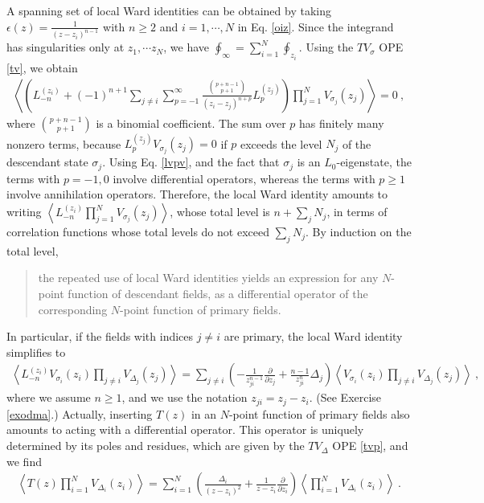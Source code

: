 \documentclass[12pt, a4paper, notitlepage, twoside]{report}
\numberwithin{equation}{section}
\theoremstyle{break}
\begin{document}
A spanning set of local Ward identities can be obtained by taking $\epsilon(z) = \frac{1}{(z-z_i)^{n-1}}$ with $n\geq 2$ and $i=1, \cdots , N$ in Eq. \eqref{oiz}. 
Since the integrand has singularities only at $z_1,\cdots z_N$, we have $\oint_\infty=\sum_{i=1}^N \oint_{z_i}$.
Using the 
$TV_\sigma$ OPE \eqref{tv}, we obtain
\begin{align}
 \left\langle \left( L_{-n}^{(z_i)} + (-1)^{n+1}\sum_{j\neq i}\sum_{p=-1}^\infty \frac{\binom{p+n-1}{p+1}}{(z_i-z_j)^{n+p}} L_p^{(z_j)}\right)  \prod_{j=1}^N V_{\sigma_j}(z_j) \right\rangle = 0\ ,
\label{lwi}
\end{align}
where $\binom{p+n-1}{p+1}$ is a binomial coefficient.
The sum over $p$ has finitely many nonzero terms, because $L_p^{(z_j)}V_{\sigma_j}(z_j)=0$ if $p$ exceeds the level $N_j$ of the descendant state $\sigma_j$. 
Using Eq. \eqref{lvpv}, and the fact that $\sigma_j$ is an $L_0$-eigenstate, the terms with $p=-1,0$ involve differential operators, whereas the terms with $p\geq 1$ involve annihilation operators. 
Therefore, the local Ward identity amounts to writing $\left\langle  L_{-n}^{(z_i)} \prod_{j=1}^N V_{\sigma_j}(z_j) \right\rangle$, whose total level is $n+\sum_j N_j$, in terms of correlation functions whose total levels do not exceed $\sum_jN_j$. By induction on the total level,
\begin{quote}
 the repeated use of local Ward identities yields an expression for any $N$-point function of descendant fields, as a differential operator of the corresponding $N$-point function of primary fields.
\end{quote}
In particular, if the fields with indices $j\neq i$ are primary, the local Ward identity simplifies to
\begin{align}
 \boxed{\left\langle L_{-n}^{(z_i)}V_{\sigma_i}(z_i)\prod_{j\neq i} V_{\Delta_j}(z_j) \right\rangle =
\sum_{j\neq i} \left(-\frac{1}{z_{ji}^{n-1}} {\frac{\partial}{\partial z_j}}  + \frac{n-1}{z_{ji}^n} \Delta_j\right)
\left\langle V_{\sigma_i}(z_i)\prod_{j\neq i} V_{\Delta_j}(z_j) \right\rangle} \ ,
\label{lmn}
\end{align}
where we assume $n\geq 1$, and we use the notation $z_{ji}=z_j-z_i$. (See Exercise \ref{exodma}.) Actually, inserting $T(z)$ in an $N$-point function of primary fields also amounts to acting with a differential operator. This operator is uniquely determined by its poles and residues, which are given by the $TV_\Delta$ OPE \eqref{tvp}, and we find
\begin{align}
 \boxed{\left\langle T(z) \prod_{i=1}^N V_{\Delta_i}(z_i)\right\rangle = \sum_{i=1}^N \left(\frac{\Delta_i}{(z-z_i)^2} + \frac{1}{z-z_i}{\frac{\partial}{\partial z_i}}\right)\left\langle  \prod_{i=1}^N V_{\Delta_i}(z_i)\right\rangle }\ .
\label{dtz}
\end{align}
\end{document}
